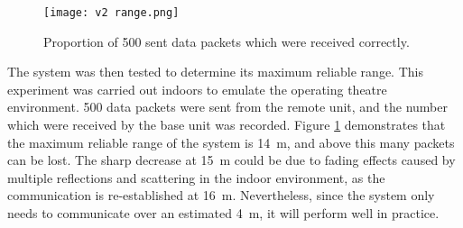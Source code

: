 \begin{figure}[htb]
	\centering
	\texttt{[image: v2 range.png]}
	\caption{Proportion of 500 sent data packets which were received correctly.}
	\label{fig: range}
\end{figure}

The system was then tested to determine its maximum reliable range. This experiment was carried out indoors to emulate the operating theatre environment. 500 data packets were sent from the remote unit, and the number which were received by the base unit was recorded. Figure \ref{fig: range} demonstrates that the maximum reliable range of the system is \SI{14}{\metre}, and above this many packets can be lost. The sharp decrease at \SI{15}{\metre} could be due to fading effects caused by multiple reflections and scattering in the indoor environment, as the communication is re-established at \SI{16}{\metre}. Nevertheless, since the system only needs to communicate over an estimated \SI{4}{\metre}, it will perform well in practice.








